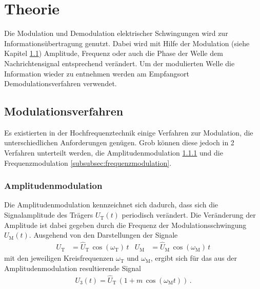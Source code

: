 \section{Theorie}
\label{sec:Theorie}
Die Modulation und Demodulation
elektrischer Schwingungen wird
zur Informationsübertragung genutzt.
Dabei wird mit Hilfe der Modulation
(siehe Kapitel \ref{subsec:modulationsverfahren})
Amplitude, Frequenz oder auch die Phase
der Welle dem Nachrichtensignal entsprechend
verändert.
Um der modulierten Welle die Information
wieder zu entnehmen werden am Empfangsort
Demodulationsverfahren verwendet.

\subsection{Modulationsverfahren}
\label{subsec:modulationsverfahren}
Es existierten in der Hochfrequenztechnik einige
Verfahren zur Modulation, die unterschiedlichen
Anforderungen genügen. Grob können diese
jedoch in 2 Verfahren unterteilt
werden, die Amplitudenmodulation \ref{subsubsec:amplitudenmodulation}
und die Frequenzmodulation \ref{subsubsec:frequenzmodulation}.

\subsubsection{Amplitudenmodulation}
\label{subsubsec:amplitudenmodulation}
Die Amplitudenmodulation kennzeichnet sich
dadurch, dass sich die Signalamplitude
des Trägers $U_{\text{T}}(t)$ periodisch verändert.
Die Veränderung der Amplitude ist dabei gegeben
durch die Frequenz der Modulationsschwingung
$U_{\text{M}}(t)$.
Ausgehend von den Darstellungen der Signale
\begin{align}
U_{\text{T}} &= \hat{U}_{\text{T}} \, \cos (\omega_{\text{T}}) \, t&
U_{\text{M}} &= \hat{U}_{\text{M}} \, \cos (\omega_{\text{M}}) \, t
\end{align}
mit den jeweiligen Kreisfrequenzen $\omega_{\text{T}}$ und $\omega_{\text{M}}$,
ergibt sich für das aus der Amplitudenmodulation resultierende Signal
\begin{align}
\label{eqn:1}
U_{3}(t) = \hat{U}_{\text{T}} \, \left( 1 + m \, \cos(\omega_{\text{M}} t) \right) \, .
\end{align}

